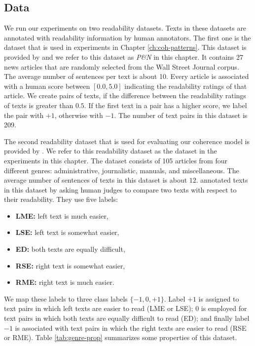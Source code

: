 \subsection{Data}
We run our experiments on two readability datasets. 
Texts in these datasets are annotated with readability information by human annotators.
The first one is the dataset that is used in experiments in Chapter \ref{ch:coh-patterns}. 
This dataset is provided by  and we refer to this dataset as \emph{P\&N} in this chapter.  
It contains 27 news articles that are randomly selected from
the Wall Street Journal corpus. 
The average number of sentences per text is about 10.   
Every article is associated with a human score between $[0.0,5.0]$ indicating the readability ratings of that article. 
We create pairs of texts, if the difference between the readability ratings of texts is greater than $0.5$. 
If the first text in a pair has a higher score, we label
the pair with $+1$, otherwise with $-1$. 
The number of text pairs in this dataset is 209.

The second readability dataset that is used for evaluating our coherence model is provided by .  
We refer to this readability dataset as the \declercqds dataset in the experiments in this chapter.  
The \declercqds dataset consists of 105 articles from four different genres: administrative, journalistic, manuals, and miscellaneous. 
The average number of sentences of texts in this dataset is about $12$. 
 annotated texts in this dataset by asking human judges to compare two texts with respect to their readability. 
They use five labels:

\begin{itemize}
  \item \textbf{LME:} left text is much easier,
  \item \textbf{LSE:} left text is somewhat easier, 
  \item \textbf{ED:} both texts are equally difficult,
  \item \textbf{RSE:} right text is somewhat easier,
  \item \textbf{RME:} right text is much easier.
\end{itemize}

We map these labels to three class labels $\lbrace -1, 0, +1 \rbrace$.  Label $+1$ is assigned to text pairs in which left texts are easier to read (LME or LSE); 
$0$ is employed for text pairs in which both texts are equally difficult to read (ED); and finally label $-1$ is associated with text pairs in which the right texts are easier to read (RSE or RME). 
Table \ref{tab:genre-prop} summarizes some properties of this dataset.

